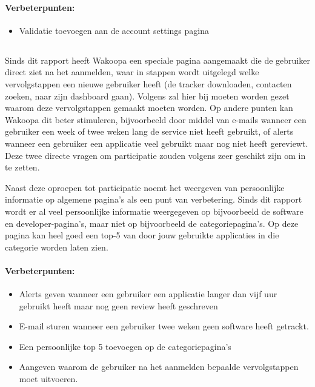 \documentclass[a4paper, 10pt, pdftex]{report}
\begin{document}
      \paragraph{\textbf{Verbeterpunten:}}
      \begin{itemize}
        \item Validatie toevoegen aan de account settings pagina
      \end{itemize}

    \subsection{\cite{Alfrink2008}}
    Sinds dit rapport heeft Wakoopa een speciale pagina aangemaakt die de gebruiker direct ziet na het aanmelden, waar in stappen wordt uitgelegd welke vervolgstappen een nieuwe gebruiker heeft (de tracker downloaden, contacten zoeken, naar zijn dashboard gaan). Volgens \citeauthor{Brouns2008} zal hier bij moeten worden gezet waarom deze vervolgstappen gemaakt moeten worden. Op andere punten kan Wakoopa dit beter stimuleren, bijvoorbeeld door middel van e-mails wanneer een gebruiker een week of twee weken lang de service niet heeft gebruikt, of alerts wanneer een gebruiker een applicatie veel gebruikt maar nog niet heeft gereviewt. Deze twee directe vragen om participatie zouden volgens \citeauthor{Alfrink2008} zeer geschikt zijn om in te zetten.

    Naast deze oproepen tot participatie noemt \citeauthor{Alfrink2008} het weergeven van persoonlijke informatie op algemene pagina's als een punt van verbetering. Sinds dit rapport wordt er al veel persoonlijke informatie weergegeven op bijvoorbeeld de software en developer-pagina's, maar niet op bijvoorbeeld de categoriepagina's. Op deze pagina kan heel goed een top-5 van door jouw gebruikte applicaties in die categorie worden laten zien.
    \paragraph{\textbf{Verbeterpunten:}}
      \begin{itemize}
        \item Alerts geven wanneer een gebruiker een applicatie langer dan vijf uur gebruikt heeft maar nog geen review heeft geschreven
        \item E-mail sturen wanneer een gebruiker twee weken geen software heeft getrackt.
        \item Een persoonlijke top 5 toevoegen op de categoriepagina's
        \item Aangeven waarom de gebruiker na het aanmelden bepaalde vervolgstappen moet uitvoeren.
      \end{itemize}
\end{document}
